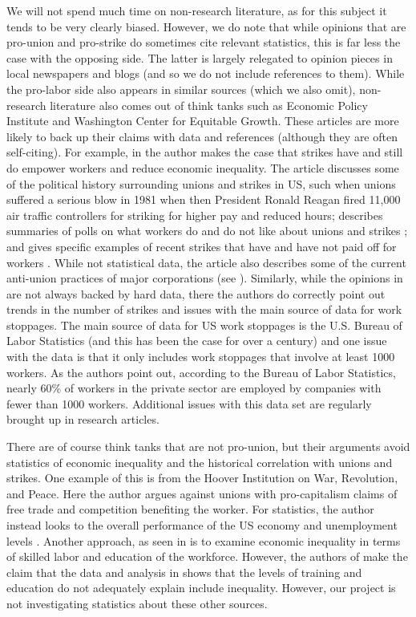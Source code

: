 \documentclass[reqno,11pt]{amsart}
\begin{document}
We will not spend much time on non-research literature, as for this subject it 
tends to be very clearly biased. However, we do note that while opinions
that are pro-union and pro-strike do sometimes cite relevant statistics,
this is far less the case with the opposing side. The latter is largely relegated 
to opinion pieces in local newspapers and blogs (and so we do not include 
references to them). While the pro-labor side also appears in similar sources
(which we also omit), non-research literature also comes out of think tanks such as
Economic Policy Institute and Washington Center for Equitable Growth.
These articles are more likely to back up their claims with data
and references (although they are often self-citing).
For example, in \cite{Misc1a} the author makes the case that strikes 
have and still do empower workers and reduce economic inequality. The article
discusses some of the political history surrounding unions and strikes 
in US, such when unions suffered a serious blow in 1981 when then President
Ronald Reagan fired 11,000 air traffic controllers for striking for higher pay
and reduced hours; describes summaries of polls on what workers do and do not
like about unions and strikes \cite{Misc1d}; and gives specific examples
of recent strikes that have and have not paid off for workers \cite{Misc1e}.
While not statistical data, the article also describes
some of the current anti-union practices of major corporations 
(see \cite{Misc1b}). Similarly, while the opinions in 
\cite{Misc3, Misc2} are not always backed by hard data, there the authors
do correctly point out trends in the number of strikes and issues
with the main source of data for work stoppages. The main source of
data for US work stoppages is the U.S. Bureau of Labor Statistics
(and this has been the case for over a century) and one issue
with the data is that it only includes work stoppages that involve at least 
1000 workers. As the authors point out, according to the Bureau of Labor
Statistics, nearly 60\% of workers in the private sector are employed
by companies with fewer than 1000 workers. Additional issues with this
data set are regularly brought up in research articles.

There are of course think tanks that are not pro-union, but their
arguments avoid statistics of economic inequality and the historical
correlation with unions and strikes. One example
of this is \cite{Misc4} from the Hoover Institution on War, Revolution, 
and Peace. Here the author argues against unions with pro-capitalism claims
of free trade and competition benefiting the worker. For statistics, 
the author instead looks to the overall performance of the US economy and unemployment levels
\cite{Misc4a, Misc4b, Misc4c}.
Another approach, as seen in \cite{Misc5} is to examine economic
inequality in terms of skilled labor and education of the workforce.
However, the authors of \cite{Misc1c} make the claim that the data and analysis in \cite{Misc1ci} 
shows that the levels of training and education do not adequately explain
include inequality. However, our project is not investigating statistics
about these other sources.
\end{document}
